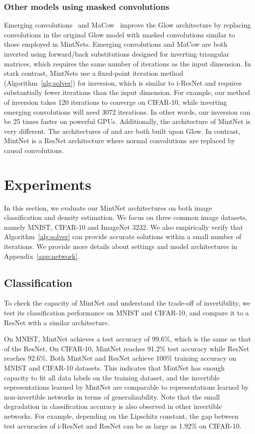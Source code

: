 \documentclass{article}
\newcommand{\algoref}[1]{Algorithm~\ref{#1}}
\begin{document}
\subsubsection{Other models using masked convolutions}
Emerging convolutions~\cite{hoogeboom2019emerging} and MaCow~\cite{ma2019macow} improve the Glow architecture by replacing  convolutions in the original Glow model with masked convolutions similar to those employed in MintNets. Emerging convolutions and MaCow are both inverted using forward/back substitutions designed for inverting triangular matrices, which requires the same number of iterations as the input dimension. In stark contrast, MintNets use a fixed-point iteration method (\algoref{alg:solver}) for inversion, which is similar to i-ResNet and requires substantially fewer iterations than the input dimension. For example, our method of inversion takes 120 iterations to converge on CIFAR-10, while inverting emerging convolutions will need 3072 iterations. In other words, our inversion can be 25 times faster on powerful GPUs. Additionally, the architecture of MintNet is very different. The architectures of \cite{hoogeboom2019emerging} and \cite{ma2019macow} are both built upon Glow. In contrast, MintNet is a ResNet architecture where normal convolutions are replaced by causal convolutions.


 \section{Experiments}\label{sec:exp}
In this section, we evaluate our MintNet architectures on both image classification and density estimation. We focus on three common image datasets, namely MNIST, CIFAR-10 and ImageNet 3232. We also empirically verify that \algoref{alg:solver} can provide accurate solutions within a small number of iterations. We provide more details about settings and model architectures in Appendix~\ref{app:network}.

\subsection{Classification}
To check the capacity of MintNet and understand the trade-off of invertibility, we test its classification performance on MNIST and CIFAR-10, and compare it to a ResNet with a similar architecture. 




On MNIST, MintNet achieves a test accuracy of 99.6\%, which is the same as that of the ResNet. On CIFAR-10, MintNet reaches 91.2\% test accuracy while ResNet reaches 92.6\%. 
Both MintNet and ResNet achieve 100\% training accuracy on MNIST and CIFAR-10 datasets. This indicates that MintNet has enough capacity to fit all data labels on the training dataset, and the invertible representations learned by MintNet are comparable to representations learned by non-invertible networks in terms of generalizability. Note that the small degradation in classification accuracy is also observed in other invertible networks. For example, depending on the Lipschitz constant, the gap between test accuracies of i-ResNet and ResNet can be as large as 1.92\% on CIFAR-10.  
\end{document}
